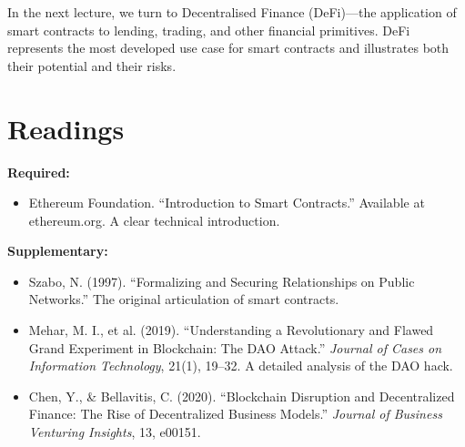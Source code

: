 \documentclass[11pt,a4paper]{article}
\begin{document}
In the next lecture, we turn to Decentralised Finance (DeFi)---the application of smart contracts to lending, trading, and other financial primitives. DeFi represents the most developed use case for smart contracts and illustrates both their potential and their risks.

\section*{Readings}

\textbf{Required:}
\begin{itemize}
    \item Ethereum Foundation. ``Introduction to Smart Contracts.'' Available at ethereum.org. A clear technical introduction.
\end{itemize}

\textbf{Supplementary:}
\begin{itemize}
    \item Szabo, N. (1997). ``Formalizing and Securing Relationships on Public Networks.'' The original articulation of smart contracts.
    \item Mehar, M. I., et al. (2019). ``Understanding a Revolutionary and Flawed Grand Experiment in Blockchain: The DAO Attack.'' \textit{Journal of Cases on Information Technology}, 21(1), 19--32. A detailed analysis of the DAO hack.
    \item Chen, Y., \& Bellavitis, C. (2020). ``Blockchain Disruption and Decentralized Finance: The Rise of Decentralized Business Models.'' \textit{Journal of Business Venturing Insights}, 13, e00151.
\end{itemize}

\end{document}
